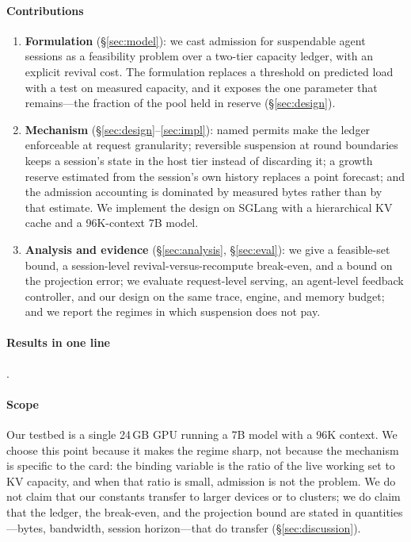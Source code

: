 \paragraph{Contributions}
\begin{enumerate}
\item \textbf{Formulation} (\S\ref{sec:model}): we cast admission for suspendable agent
sessions as a feasibility problem over a two-tier capacity ledger, with an explicit
revival cost. The formulation replaces a threshold on predicted load with a test on
measured capacity, and it exposes the one parameter that remains---the fraction of the
pool held in reserve (\S\ref{sec:design}).
\item \textbf{Mechanism} (\S\ref{sec:design}--\ref{sec:impl}): named permits make the
ledger enforceable at request granularity; reversible suspension at round boundaries
keeps a session's state in the host tier instead of discarding it; a growth reserve
estimated from the session's own history replaces a point forecast; and the admission
accounting is dominated by measured bytes rather than by that estimate. We implement the design on SGLang with a
hierarchical KV cache and a 96K-context 7B model.
\item \textbf{Analysis and evidence} (\S\ref{sec:analysis}, \S\ref{sec:eval}): we give a
feasible-set bound, a session-level revival-versus-recompute break-even, and a bound on
the projection error; we evaluate request-level serving, an agent-level
feedback controller, and our design on the same trace, engine, and memory budget; and we
report the regimes in which suspension does not pay.
\end{enumerate}

\paragraph{Results in one line}
.

\paragraph{Scope}
Our testbed is a single 24\,GB GPU running a 7B model with a 96K context. We choose this
point because it makes the regime sharp, not because the mechanism is specific to the
card: the binding variable is the ratio of the live working set to KV capacity, and when
that ratio is small, admission is not the problem. We do not claim that our constants
transfer to larger devices or to clusters; we do claim that the ledger, the break-even,
and the projection bound are stated in quantities---bytes, bandwidth, session
horizon---that do transfer (\S\ref{sec:discussion}).
